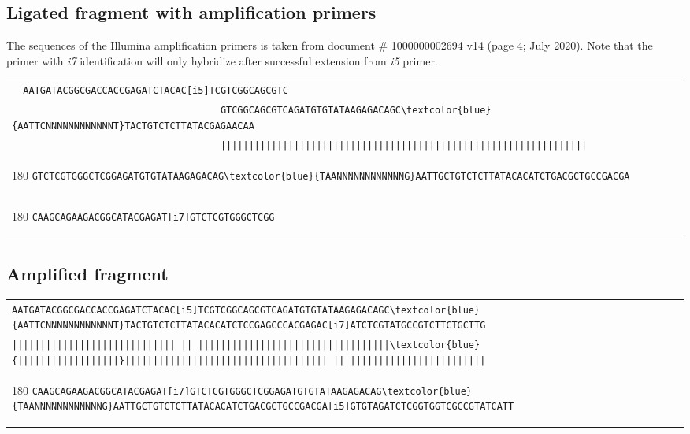 \documentclass[a4paper,12pt]{article}
\begin{document}
\begin{flushleft}
\subsection*{Ligated fragment with amplification primers}
The sequences of the Illumina amplification primers is taken from document \# 1000000002694 v14 (page 4; July 2020). Note that the primer with \emph{i7} identification will only hybridize after successful extension from \emph{i5} primer.

\begin{tabular}{l}
   \Verb+  AATGATACGGCGACCACCGAGATCTACAC[i5]TCGTCGGCAGCGTC+\\[-6pt]
   \Verb+                                     GTCGGCAGCGTCAGATGTGTATAAGAGACAGC\textcolor{blue}{AATTCNNNNNNNNNNNNT}TACTGTCTCTTATACGAGAACAA+\\[-6pt]
   \Verb+                                     |||||||||||||||||||||||||||||||||||||||||||||||||||||||||||||||||+\\[-10pt]
   \begin{turn}{180}
      \Verb+GTCTCGTGGGCTCGGAGATGTGTATAAGAGACAG\textcolor{blue}{TAANNNNNNNNNNNNG}AATTGCTGTCTCTTATACACATCTGACGCTGCCGACGA                                   +
   \end{turn}
\\[-6pt]
   \begin{turn}{180}
      \Verb+CAAGCAGAAGACGGCATACGAGAT[i7]GTCTCGTGGGCTCGG                                                                                                            +
   \end{turn}
\\
\end{tabular}
\vspace*{0.3cm}

\subsection*{Amplified fragment}
\begin{tabular}{l}
\Verb+AATGATACGGCGACCACCGAGATCTACAC[i5]TCGTCGGCAGCGTCAGATGTGTATAAGAGACAGC\textcolor{blue}{AATTCNNNNNNNNNNNNT}TACTGTCTCTTATACACATCTCCGAGCCCACGAGAC[i7]ATCTCGTATGCCGTCTTCTGCTTG+\\[-10pt]
\Verb+||||||||||||||||||||||||||||| || ||||||||||||||||||||||||||||||||||\textcolor{blue}{||||||||||||||||||}|||||||||||||||||||||||||||||||||||| || ||||||||||||||||||||||||+\\[-12pt]
\begin{turn}{180}
   \Verb+CAAGCAGAAGACGGCATACGAGAT[i7]GTCTCGTGGGCTCGGAGATGTGTATAAGAGACAG\textcolor{blue}{TAANNNNNNNNNNNNG}AATTGCTGTCTCTTATACACATCTGACGCTGCCGACGA[i5]GTGTAGATCTCGGTGGTCGCCGTATCATT+
\end{turn}
\\
\end{tabular}
\vspace*{0.3cm}


\end{flushleft}
\end{document}
